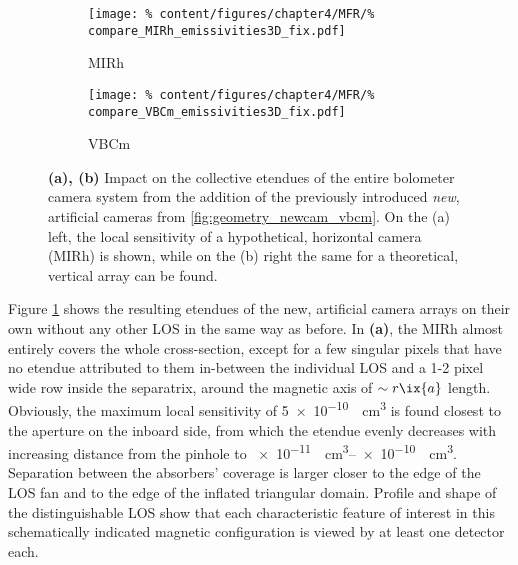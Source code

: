 %
        \begin{figure}[t]%
            \centering%
            \begin{subfigure}{0.47\textwidth}%
                \texttt{[image: \%
                    content/figures/chapter4/MFR/\%
                    compare\_MIRh\_emissivities3D\_fix.pdf]}%
                \caption{MIRh}%
            \end{subfigure}%
            \hspace*{0.5cm}%
            \begin{subfigure}{0.47\textwidth}%
                \texttt{[image: \%
                    content/figures/chapter4/MFR/\%
                    compare\_VBCm\_emissivities3D\_fix.pdf]}%
                \caption{VBCm}%
            \end{subfigure}%
            \caption{\textbf{(a), (b)} Impact on the collective etendues of the entire bolometer camera system from the addition of the previously introduced \textit{new}, artificial cameras from \cref{fig:geometry_newcam_vbcm}. On the (a) left, the local sensitivity of a hypothetical, horizontal camera (MIRh) is shown, while on the (b) right the same for a theoretical, vertical array can be found.}\label{fig:emiss_change_artificials}%
        \end{figure}%
%
        \newline%
        Figure \ref{fig:emiss_change_artificials} shows the resulting etendues of the new, artificial camera arrays on their own without any other LOS in the same way as before. In \textbf{(a)}, the MIRh almost entirely covers the whole cross-section, except for a few singular pixels that have no etendue attributed to them in-between the individual LOS and a 1-2 pixel wide row inside the separatrix, around the magnetic axis of $\sim r\ix{a}$ length. Obviously, the maximum local sensitivity of \SI{5e-10}{\per\cubic\centi\meter} is found closest to the aperture on the inboard side, from which the etendue evenly decreases with increasing distance from the pinhole to \SIrange{e-11}{e-10}{\per\cubic\centi\meter}. Separation between the absorbers' coverage is larger closer to the edge of the LOS fan and to the edge of the inflated triangular domain. Profile and shape of the distinguishable LOS show that each characteristic feature of interest in this schematically indicated magnetic configuration is viewed by at least one detector each.\\%
